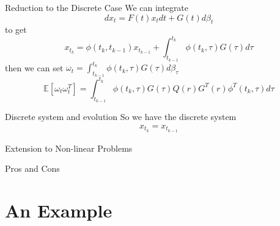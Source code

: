 \documentclass{beamer}
\begin{document}
\begin{frame}{Reduction to the Discrete Case}
  We can integrate
  \begin{equation}
    dx_t = F(t) x_t dt + G(t) d\beta_t 
  \end{equation}
  to get
  \begin{equation}
    x_{t_k} = \phi(t_k,t_{k-1})x_{t_{k-1}} + \int_{t_{k-1}}^{t_k} \phi(t_k,\tau) G(\tau) d\tau
  \end{equation}
  then we can set $ \omega_t = \int_{t_{k-1}}^{t_k} \phi(t_k,\tau) G(\tau) d\beta_\tau $ 
  \begin{equation}
    \mathbb{E}[\omega_t\omega_t^T] = \int_{t_{k-1}}^{t_k} \phi(t_k,\tau) G(\tau) Q(r) G^T(r) \phi^T(t_k,\tau)  d\tau
  \end{equation}
\end{frame}

\begin{frame}{Discrete system and evolution}
  So we have the discrete system
  \begin{align}
    x_{t_k} = x_{t_{k-1}}
  \end{align}

\end{frame}

 
\begin{frame}{Extension to Non-linear Problems}

\end{frame}

\begin{frame}{Pros and Cons}

\end{frame}
  

\section{An Example}
\end{document}
